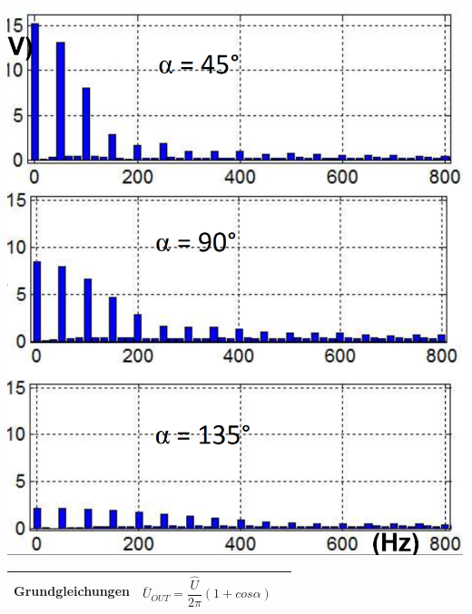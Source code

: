 \begin{minipage}{0.25\linewidth}
    \includegraphics[width=\linewidth]{images/M1COW} 
\end{minipage}
\newline

\begin{longtable}{| p{} | p{} | p{} |} %
    \hline
    \textbf{Grundgleichungen}&
    \[ \bar{U}_{OUT} = \dfrac{\hat{U}}{2\pi}(1+cos \alpha)\]&\\
    \hline   
\end{longtable}



